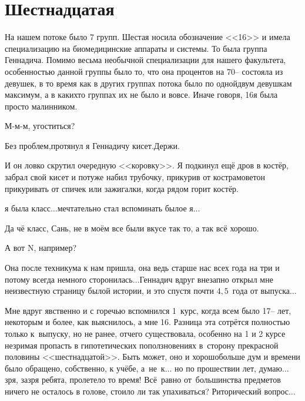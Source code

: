 \newpage
\section*{Шестнадцатая}

На нашем потоке было 7 групп. Шестая носила обозначение <<16>> и имела специализацию на биомедицинские аппараты и системы. То была группа Геннадича. Помимо весьма необычной специализации для нашего факультета, особенностью данной группы было то, что она процентов на 70\thinspace\nobreakdash-- состояла из девушек, в то время как в других группах потока было по одной\sdash двум девушкам максимум, а в каких\sdash то группах их не было и вовсе. Иначе говоря, 16\sdash я была просто малинником.


\diagdash М-м-м, угоститься?

\diagdash Без проблем,\mdash протянул я Геннадичу кисет.\mdash Держи.

И он ловко скрутил очередную <<коровку>>. Я подкинул ещё дров в костёр, забрал свой кисет и потуже набил трубочку, прикурив от костра\mdash моветон прикуривать от спичек или зажигалки, когда рядом горит костёр.

\sdash я была класс$\ldots$\mdash мечтательно стал вспоминать былое я$\ldots$

\diagdash Да чё класс, Сань, не в моём все были вкусе так то, а так всё хорошо.

\diagdash А вот N, например? 

\diagdash Она после техникума к нам пришла, она ведь старше нас всех года на три и потому всегда немного сторонилась$\ldots$\mdash Геннадич вдруг внезапно открыл мне неизвестную страницу былой истории, и это спустя почти $4,5$~года от выпуска$\ldots$

Мне вдруг явственно и с горечью вспомнился 1~курс, когда всем было 17\thinspace\nobreakdash-- лет, некоторым и более, как выяснилось, а мне 16. Разница эта сотрётся полностью только к~выпуску, но не ранее, отчего существовала, особенно на 1 и 2 курсе незримая пропасть в гипотетических поползновениях в~сторону прекрасной половины <<шестнадцатой>>. Быть может, оно и хорошо\mdash больше дум и времени было обращено, собственно, к учёбе, а~не~к$\ldots$ но по прошествии лет, думаю$\ldots$ зря, зазря ребята, пролетело то время! Всё~равно от~большинства предметов ничего не осталось в голове, стоило ли так упахиваться? Риторический вопрос$\ldots$

